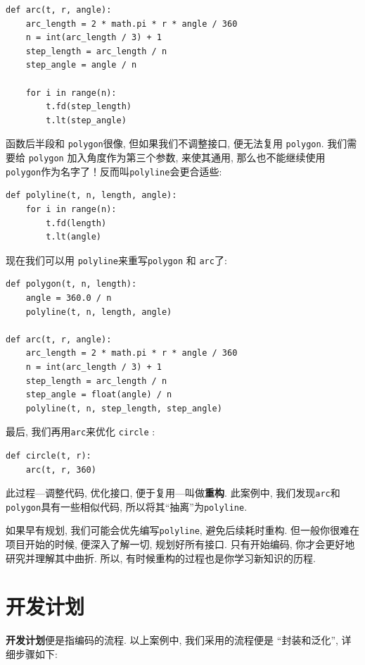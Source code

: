 \documentclass[10pt]{book}
\begin{document}
\begin{verbatim}
def arc(t, r, angle):
    arc_length = 2 * math.pi * r * angle / 360
    n = int(arc_length / 3) + 1
    step_length = arc_length / n
    step_angle = angle / n
    
    for i in range(n):
        t.fd(step_length)
        t.lt(step_angle)
\end{verbatim}
%
函数后半段和 {\tt polygon}很像, 但如果我们不调整接口, 便无法复用 {\tt polygon}. 
我们需要给 {\tt polygon} 加入角度作为第三个参数, 来使其通用, 
那么也不能继续使用 {\tt polygon}作为名字了！反而叫{\tt polyline}会更合适些:

\begin{verbatim}
def polyline(t, n, length, angle):
    for i in range(n):
        t.fd(length)
        t.lt(angle)
\end{verbatim}
%
现在我们可以用 {\tt polyline}来重写{\tt polygon} 和 {\tt arc}了:

\begin{verbatim}
def polygon(t, n, length):
    angle = 360.0 / n
    polyline(t, n, length, angle)

def arc(t, r, angle):
    arc_length = 2 * math.pi * r * angle / 360
    n = int(arc_length / 3) + 1
    step_length = arc_length / n
    step_angle = float(angle) / n
    polyline(t, n, step_length, step_angle)
\end{verbatim}
%
最后, 我们再用{\tt arc}来优化 {\tt circle} :

\begin{verbatim}
def circle(t, r):
    arc(t, r, 360)
\end{verbatim}
%
此过程---调整代码, 优化接口, 便于复用---叫做{\bf 重构}. 
此案例中, 我们发现{\tt arc}和{\tt polygon}具有一些相似代码, 
所以将其``抽离''为{\tt polyline}.\

如果早有规划, 我们可能会优先编写{\tt polyline}, 避免后续耗时重构. 
但一般你很难在项目开始的时候, 便深入了解一切, 规划好所有接口. 
只有开始编码, 你才会更好地研究并理解其中曲折. 
所以, 有时候重构的过程也是你学习新知识的历程. 


\section{开发计划}

{\bf 开发计划}便是指编码的流程. 以上案例中, 我们采用的流程便是
``封装和泛化'', 详细步骤如下:
\end{document}
